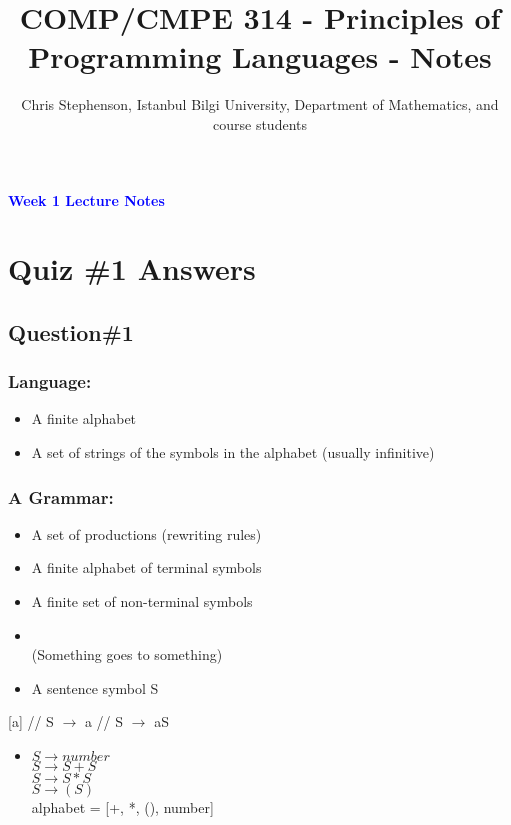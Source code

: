 \documentclass{article}
\newcommand\tab[1][1cm]{\hspace*{#1}}
\begin{document}
\title{COMP/CMPE 314 - Principles of Programming Languages - Notes}
\author{Chris Stephenson, Istanbul Bilgi University, Department of Mathematics, and course students}
\maketitle

\begin{flushleft}
\textcolor{blue}{\textbf{{\huge Week 1 Lecture Notes}}}
\section*{Quiz \#1 Answers}
\subsection*{Question\#1}
\subsubsection*{Language:}
  \begin{itemize}
        \item A finite alphabet
        \item A set of strings of the symbols in the alphabet (usually infinitive)
   \end{itemize}
 
\subsubsection*{A Grammar:}
  \begin{itemize}
   \item A set of productions (rewriting rules)
   \item A finite alphabet of terminal symbols
   \item A finite set of non-terminal symbols\\
\vspace*{0.2cm}
\item[] \tab{\LARGE $\bullet$ $\rightarrow$ $\bullet$ }\\
\bigskip
(Something goes to something)
   \item A sentence symbol S
  \end{itemize}

[a] // S $\rightarrow$ a // S $\rightarrow$ aS
  \begin{itemize}

   \item $S \rightarrow number$\\
   $S \rightarrow S + S$\\
   $S \rightarrow S * S$\\
   $S \rightarrow (S)$\\
   alphabet = [+, *, (), number]
  

\end{itemize}
\end{flushleft}
\end{document}
